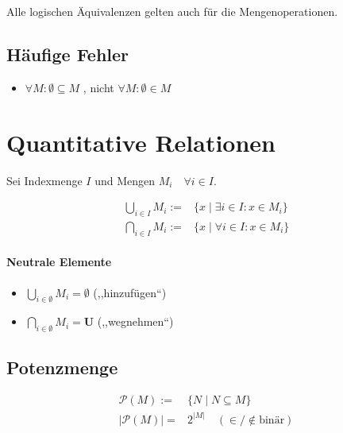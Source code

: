Alle logischen Äquivalenzen gelten auch für die Mengenoperationen.

\subsection{Häufige Fehler}

\begin{itemize}
  \item $\forall M: \emptyset \boldsymbol{\subseteq} M$
        , nicht
        $\forall M: \emptyset \in M$
\end{itemize}

\section{Quantitative Relationen}

Sei Indexmenge $I$ und Mengen $M_i \quad \forall i \in I$.

\begin{align*}
  \bigcup_{i \in I} M_i
  :=                       & \{x \mid \boldsymbol{\exists} i \in I: x \in M_i \} \\
  \bigcap_{i \in I} M_i := & \{x \mid \boldsymbol{\forall} i \in I: x \in M_i \}
\end{align*}

\paragraph{Neutrale Elemente}

\begin{mzImportant}
  \begin{itemize}
    \item $\bigcup_{i \in \emptyset} M_i = \boldsymbol{\emptyset}$ (,,hinzufügen``)

    \item $\bigcap_{i \in \emptyset} M_i = \boldsymbol{U}$ (,,wegnehmen``)
  \end{itemize}
\end{mzImportant}

\subsection{Potenzmenge}

\begin{align*}
  \mathcal{P}(M) :=  & \{N \mid N \subseteq M \}                 \\
  |\mathcal{P}(M)| = & 2^{|M|} \quad (\in / \notin \text{binär})
\end{align*}

